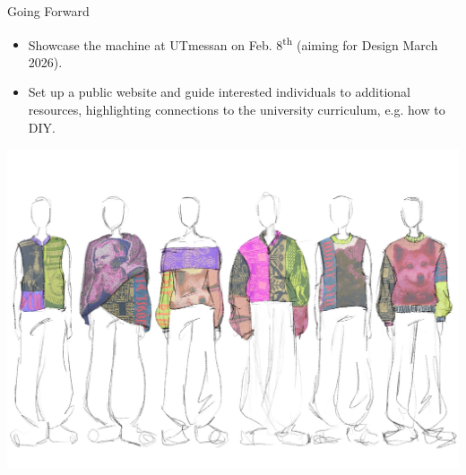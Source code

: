 \documentclass[
    NAME={Dr. Helga Ingimundardóttir},
    EMAIL={helgaingim@hi.is},
    FACULTY={Industrial Engineering},
    TITLE={HiDef Textiles: Reviving Tradition with Innovation},
    SUBTITLE={Empowering Creativity and Sustainability in Textile Production through Digital Transformation},
    SEMINAR={Reykjavík DataBeers},
    DATE={January 25, 2025},
    WIDE={true}
]{HI-LaTeX/hi-beamer}
\begin{document}
\begin{frame}{Going Forward}
\begin{itemize}
    \item Showcase the machine at \alert{UTmessan} on Feb. 8\textsuperscript{th} (aiming for \alert{Design March} 2026).
    \item Set up a public website and guide interested individuals to additional resources, highlighting connections to the university curriculum, e.g. how to DIY.    
\end{itemize}
\includegraphics[width=\linewidth,clip,trim=0 10cm 0 8cm]{include/gisa.JPG}
\end{frame}
\end{document}
